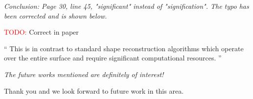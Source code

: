\documentclass[11pt]{article}
\newcommand{\todo}{{\large \textcolor{red}{TODO: }}}
\newenvironment{correction}{\begin{list}{}{\setlength{\leftmargin}{1cm}\setlength{\rightmargin}{1cm}}\vspace{\parsep}\item[]``}{''\end{list}}
\newcommand{\comment}[1]{\item \itshape #1 \normalfont}
\begin{document}
\begin{itemize}
\comment{
Conclusion:
Page 30, line 45, "significant" instead of "signification".
}
The typo has been corrected and is shown below.

\todo Correct in paper
\begin{correction}
This is in contrast to standard shape reconstruction algorithms which operate over the entire surface and require significant computational resources.
\end{correction}

\comment{
The future works mentioned are definitely of interest!
}

Thank you and we look forward to future work in this area.

\end{itemize}




\end{document}
